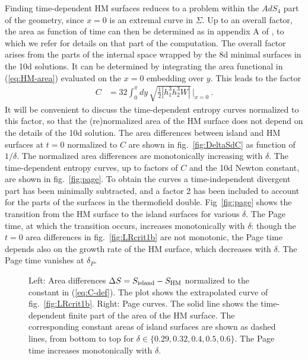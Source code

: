 \documentclass[aps,prd,11pt,notitlepage,longbibliography,nofootinbib,tightenlines,preprintnumbers]{revtex4-1}
\begin{document}
Finding time-dependent HM surfaces reduces to a problem within the $AdS_4$ part of the geometry, since $x=0$ is an extremal curve in $\Sigma$. Up to an overall factor, the area as function of time can then be determined as in appendix A of \cite{Geng:2020fxl}, to which we refer for details on that part of the computation.
The overall factor arises from the parts of the internal space wrapped by the 8d minimal surfaces in the 10d solutions.
It can be determined by integrating the area functional in (\ref{eq:HM-area}) evaluated on the $x=0$ embedding over $y$.
This leads to the factor
\begin{align}\label{eq:C-def}
	C&=32\int_0^\pi dy\,\sqrt{\frac{1}{2}\left|h_1^3h_2^3W\right|}\,\Bigg\vert_{x=0}~.
\end{align}
It will be convenient to discuss the time-dependent entropy curves normalized to this factor, so that the (re)normalized area of the HM surface does not depend on the details of the 10d solution.
The area differences between island and HM surfaces at $t=0$ normalized to $C$ are shown in fig.~\ref{fig:DeltaSdC} as function of $1/\delta$.
The normalized area differences are monotonically increasing with $\delta$.
%
The time-dependent entropy curves, up to factors of $C$ and the 10d Newton constant, are shown in fig.~\ref{fig:page}. 
To obtain the curves a time-independent divergent part has been minimally subtracted, and a factor 2 has been included to account for the parts of the surfaces in the thermofield double.
Fig~\ref{fig:page} shows the transition from the HM surface to the island surfaces for various $\delta$.
The Page time, at which the transition occurs, increases monotonically with $\delta$: though the $t=0$ area differences in fig.~\ref{fig:LRcrit1b} are not monotonic, the Page time depends also on the growth rate of the HM surface, which decreases with $\delta$.
The Page time vanishes at $\delta_P$.

\begin{figure}
	\hskip 15mm
	\caption{Left: Area differences $\Delta S=S_{\rm island}-S_{\rm HM}$ normalized to the constant in (\ref{eq:C-def}). The plot shows the extrapolated curve of fig.~\ref{fig:LRcrit1b}.
		Right: Page curves. The solid line shows the time-dependent finite part of the area of the HM surface. The corresponding constant areas of island surfaces are shown as dashed lines, from bottom to top for $\delta\in\lbrace 0.29,0.32,0.4,0.5,0.6\rbrace$. The Page time increases monotonically with $\delta$.}
\end{figure}
\end{document}
